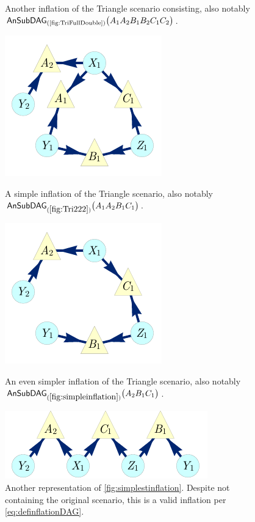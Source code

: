 \begin{figure}[h]
\begin{minipage}[b]{0.35\linewidth}
\caption{Another inflation of the Triangle scenario consisting, also notably $\ansubgraph[(\textrm{\cref{fig:TriFullDouble}})]{A_1 A_2 B_1 B_2 C_1 C_2}$.}\label{fig:Tri222}
\end{minipage}
\end{figure}

\begin{figure}[hb]
\centering
\begin{minipage}[t]{0.3\linewidth}
\centering
\includegraphics[scale=1]{broadcastingexamplenohighlight.pdf}
\caption{A simple inflation of the Triangle scenario, also notably $\ansubgraph[(\cref{fig:Tri222})]{A_1 A_2 B_1 C_1}$.}\label{fig:simpleinflation}
\end{minipage}\hfill
\begin{minipage}[t]{0.275\linewidth}
\centering
\includegraphics[scale=1]{nobroadcastingexamplenohighlight.pdf}
\caption{An even simpler inflation of the Triangle scenario, also notably $\ansubgraph[(\cref{fig:simpleinflation})]{A_2 B_1 C_1}$. }\label{fig:simplestinflation}
\end{minipage}
\hfill
\begin{minipage}[t]{0.325\linewidth}
\centering
\includegraphics[scale=1]{TriDagSubA2B1C1.pdf}
\caption{Another representation of \cref{fig:simplestinflation}. Despite not containing the original scenario, this is a valid inflation per \cref{eq:definflationDAG}.}\label{fig:TriDagSubA2B1C1}
\end{minipage}
\end{figure}

